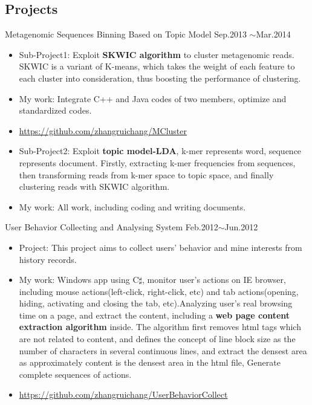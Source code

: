 \documentclass[margin]{res}
\begin{document}
\begin{resume}
\section{Projects}
Metagenomic Sequences Binning Based on Topic Model \hfill Sep.2013 $\sim$Mar.2014
\begin{spacing}{0.02}
\end{spacing}
\begin{itemize}
\item Sub-Project1: Exploit \textbf{SKWIC algorithm} to cluster metagenomic reads. SKWIC is a variant of K-means, which takes the weight of each feature to each cluster into consideration, thus boosting the performance of clustering.
\item My work: Integrate C++ and Java codes of two members, optimize and standardized codes.
\item \url{https://github.com/zhangruichang/MCluster}
\item Sub-Project2: Exploit \textbf{topic model-LDA}, k-mer represents word, sequence represents document. Firstly, extracting k-mer frequencies from sequences, then transforming reads from k-mer space to topic space, and finally clustering reads with SKWIC algorithm. 
\item My work: All work, including coding and writing documents.
\end{itemize}
User Behavior Collecting and Analysing System \hfill Feb.2012$\sim$Jun.2012
\begin{spacing}{0.1}
\end{spacing}
\begin{itemize}
\item Project: This project aims to collect users' behavior and mine interests from history records.
\item My work: Windows app using C$\sharp$, monitor user's actions on IE browser, including mouse actions(left-click, right-click, etc) and tab actions(opening, hiding, activating and closing the tab, etc).Analyzing user's real browsing time on a page, and extract the content, including a \textbf{web page content extraction algorithm} inside. The algorithm first removes html tags which are not related to content, and defines the concept of line block size as the number of characters in several continuous lines, and extract the densest area as approximately content is the densest area in the html file, Generate complete sequences of actions.
\item \url{https://github.com/zhangruichang/UserBehaviorCollect}
\end{itemize}

\end{resume}
\end{document}
